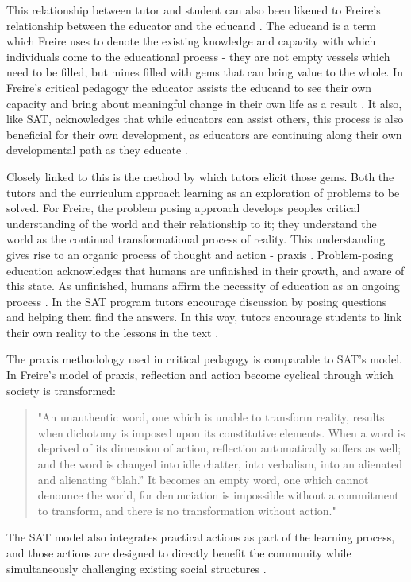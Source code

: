 This relationship between tutor and student can also been likened to Freire's relationship between the educator and the educand \citep{Freire1995}. The educand is a term which Freire uses to denote the existing knowledge and capacity with which individuals come to the educational process - they are not empty vessels which need to be filled, but mines filled with gems that can bring value to the whole. In Freire's critical pedagogy the educator assists the educand to see their own capacity and bring about meaningful change in their own life as a result \citep{Freire1995}. It also, like SAT, acknowledges that while educators can assist others, this process is also beneficial for their own development, as educators are continuing along their own developmental path as they educate \citep{Murphy-Graham2014,Freire1995}. 


Closely linked to this is the method by which tutors elicit those gems. Both the tutors and the curriculum approach learning as an exploration of problems to be solved. For Freire, the problem posing approach develops peoples critical understanding of the world and their relationship to it; they understand the world as the continual transformational process of reality. This understanding gives rise to an organic process of thought and action - praxis \cite{Freire2000}. Problem-posing education acknowledges that humans are unfinished in their growth, and aware of this state. As unfinished, humans affirm the necessity of education as an ongoing process \citep{Freire2000}. In the SAT program tutors encourage discussion by posing questions and helping them find the answers. In this way, tutors encourage students to link their own reality to the lessons in the text \citep{Murphy-Graham2009}.

The praxis methodology used in critical pedagogy is comparable to SAT's model. In Freire's model of praxis, reflection and action become cyclical through which society is transformed:
\begin{quote}
"An unauthentic word, one which is unable to transform reality, results when dichotomy is imposed upon its constitutive elements. When a word is deprived of its dimension of action, reflection automatically suffers as well; and the word is changed into idle chatter, into verbalism, into an alienated and alienating “blah.” It becomes an empty word, one which cannot denounce the world, for denunciation is impossible without a commitment to transform, and there is no transformation without action." \citep[][p87]{Freire2000}
\end{quote}
The SAT model also integrates practical actions as part of the learning process, and those actions are designed to directly benefit the community while simultaneously challenging existing social structures \citep{VanderDussen2009}. 


